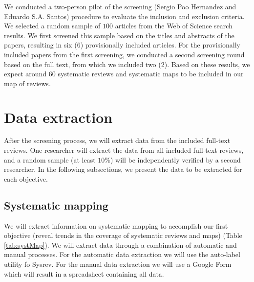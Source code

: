 \documentclass{article}
\begin{document}
We conducted a two-person pilot of the screening (Sergio Poo Hernandez and Eduardo S.A. Santos)  procedure to evaluate the inclusion and exclusion criteria. We selected a random sample of $100$ articles from the Web of Science search results. We first screened this sample based on the titles and abstracts of the papers, resulting in six ($6$) provisionally included articles. For the provisionally included papers from the first screening, we conducted a second screening round based on the full text, from which we included two ($2$). Based on these results, we expect around $60$ systematic reviews and systematic maps to be included in our map of reviews.

\section{Data extraction}

After the screening process, we will extract data from the included full-text reviews. One researcher will extract the data from all included full-text reviews, and a random sample (at least $10\%$) will be independently verified by a second researcher. In the following subsections, we present the data to be extracted for each objective.


\subsection{Systematic mapping}
We will extract information on systematic mapping to accomplish our first objective (reveal trends in the coverage of systematic reviews and maps) (Table \ref{tab:systMap}). We will extract data through a combination of automatic and manual processes. For the automatic data extraction we will use the auto-label utility fo Sysrev. For the manual data extraction we will use a Google Form which will result in a spreadsheet containing all data.

\end{document}
